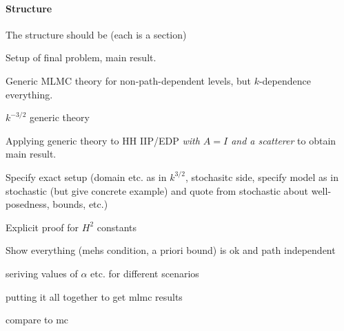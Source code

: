 \paragraph{Structure}

The structure should be (each is a section)

\bit
\item Setup of final problem, main result.
\item Generic MLMC theory for non-path-dependent levels, but $k$-dependence everything.
\item $k^{-3/2}$ generic theory
\item Applying generic theory to HH IIP/EDP \emph{with $A=I$ and a scatterer} to obtain main result.
\bit
\item Specify exact setup (domain etc. as in $k^{3/2}$, stochasitc side, specify model as in stochastic (but give concrete example) and quote from stochastic about well-posedness, bounds, etc.)
\item Explicit proof for $H^2$ constants
\item Show everything (mehs condition, a priori bound) is ok and path independent
\item seriving values of $\alpha$ etc. for different scenarios
\item putting it all together to get mlmc results
\item compare to mc
\eit
\eit